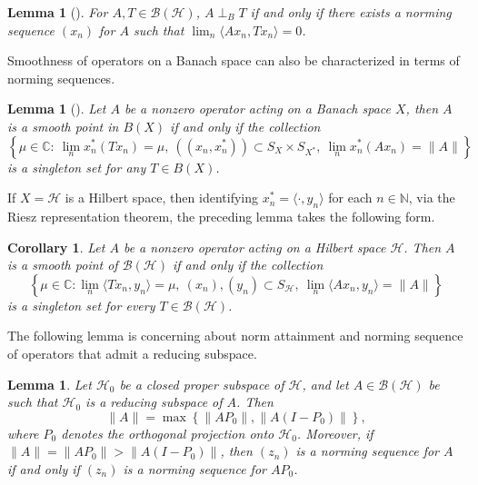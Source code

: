 \documentclass[12pt]{amsart}
\newtheorem{lemma}[theorem]{Lemma}
\newtheorem{corollary}[theorem]{Corollary}
\theoremstyle{definition}
\newcommand{\B}{\mathcal{B}}
\renewcommand{\H}{\mathcal{H}}
\begin{document}
\begin{lemma}[\cite{Bhatia-Semrl}]\label{BS-Theorem}
For $A, T \in \B(\mathcal{H})$, $A \perp_B T$ if and only if 
there exists a norming sequence $(x_n)$ for $A$ such that 
$\lim_n \langle Ax_n, Tx_n \rangle = 0$.
\end{lemma}

\noindent Smoothness of operators on a Banach space can also be characterized in terms of norming sequences.

\begin{lemma}[\cite{Roy-2024}]\label{smoothness}
Let $A$ be a nonzero operator acting on a Banach space $X$, then $A$ is a smooth point in $B \left(X \right)$ if and only if the collection
\[
 \left\{\mu\in \mathbb{C}:~\lim_n x_n^* \left(Tx_n \right)=\mu,~ \left( (x_n,x_n^*) \right)\subset S_X\times S_{X^*},~\lim_n x_n^* \left(Ax_n \right)=\|A\| \right\}
\]
is a singleton set for any $T\in B \left(X \right)$.
\end{lemma}
\noindent If $X = \mathcal{H}$ is a Hilbert space, then identifying $x_n^* = \langle \cdot, y_n \rangle$ for each $n\in \mathbb{N}$, via the Riesz representation theorem, the preceding lemma takes the following form.

\begin{corollary}\label{smoothness-Hilbert}
Let $A$ be a nonzero operator acting on a Hilbert space $\H$. Then $A$ is a smooth point of 
$\mathcal{B}(\mathcal{H})$ if and only if the collection
\[
\left\{\mu \in \mathbb{C} : \lim_n \langle Tx_n, y_n \rangle 
= \mu,\ (x_n), (y_n) \subset S_{\mathcal{H}},\ 
\lim_n \langle Ax_n, y_n \rangle = \|A\|\right\}
\]
is a singleton set for every $T \in \mathcal{B}(\mathcal{H})$.
\end{corollary}

\noindent The following lemma is concerning about norm attainment and norming sequence of operators that admit a reducing subspace.
\begin{lemma}\label{block matrix norm}
Let $\mathcal{H}_0$ be a closed proper subspace of $\mathcal{H}$, and let $A \in \B(\mathcal{H})$ be such that $\mathcal{H}_0$ is a reducing subspace of $A$. Then 
\[
\|A\| = \max\left\{\|AP_0\|, \|A(I-P_0)\|\right\},
\]
where $P_0$ denotes the orthogonal projection onto $\mathcal{H}_0$. Moreover, if $\|A\| = \|AP_0\| > \|A(I-P_0)\|$, then $(z_n)$ is a norming sequence for $A$ if and only if $(z_n)$ is a norming sequence 
for $AP_0$.
\end{lemma}
\end{document}
